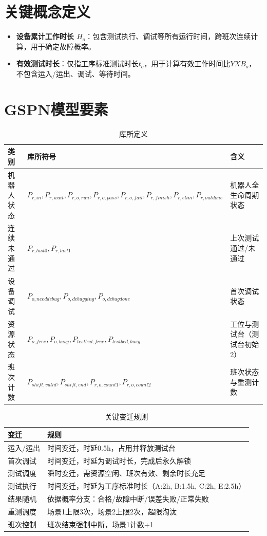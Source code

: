 \documentclass{article}
\begin{document}
\section{关键概念定义}
\begin{itemize}
    \item \textbf{设备累计工作时长 \(H_o\)}：包含测试执行、调试等所有运行时间，跨班次连续计算，用于确定故障概率。
    \item \textbf{有效测试时长}：仅指工序标准测试时长\(t_o\)，用于计算有效工作时间比\(YXB_o\)，不包含运入/运出、调试、等待时间。
\end{itemize}

\section{GSPN模型要素}

\begin{table}[H]
\centering
\caption{库所定义}
\begin{tabular}{lll}
\toprule
\textbf{类别} & \textbf{库所符号} & \textbf{含义} \\
\midrule
机器人状态 & \(P_{r,in},P_{r,wait},P_{r,o,run},P_{r,o,pass},P_{r,o,fail},P_{r,finish},P_{r,elim},P_{r,outdone}\) & 机器人全生命周期状态 \\
连续未通过 & \(P_{r,last0},P_{r,last1}\) & 上次测试通过/未通过 \\
设备调试 & \(P_{o,needdebug},P_{o,debugging},P_{o,debugdone}\) & 首次调试状态 \\
资源状态 & \(P_{o,free},P_{o,busy},P_{testbed,free},P_{testbed,busy}\) & 工位与测试台（测试台初始2） \\
班次计数 & \(P_{shift,valid},P_{shift,end},P_{r,o,count1},P_{r,o,count2}\) & 班次状态与重测计数 \\
\bottomrule
\end{tabular}
\end{table}

\begin{table}[H]
\centering
\caption{关键变迁规则}
\begin{tabular}{ll}
\toprule
\textbf{变迁} & \textbf{规则} \\
\midrule
运入/运出 & 时间变迁，时延0.5h，占用并释放测试台 \\
首次调试 & 时间变迁，时延为调试时长，完成后永久解锁 \\
测试调度 & 瞬时变迁，需资源空闲、班次有效、剩余时长充足 \\
测试执行 & 时间变迁，时延为工序标准时长（A:2h, B:1.5h, C:2h, E:2.5h） \\
结果随机 & 依据概率分支：合格/故障中断/误差失败/正常失败 \\
重测调度 & 场景1上限3次，场景2上限2次，超限淘汰 \\
班次控制 & 班次结束强制中断，场景1计数+1 \\
\bottomrule
\end{tabular}
\end{table}
\end{document}
